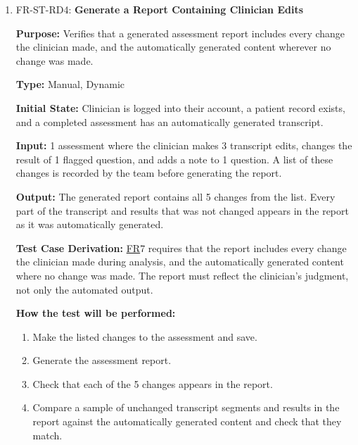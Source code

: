 \documentclass[12pt, titlepage]{article}
\newcommand{\srsfr}[1]{\href{https://github.com/Nour-Fawaz/MacaBoca/blob/main/pdfs/SRS/SRS.pdf}{FR}}
\renewcommand{\_}{\oldunderscore\allowbreak}
\begin{document}
\begin{enumerate}
  \item FR-ST-RD4: \textbf{Generate a Report Containing Clinician Edits\\}
  \begin{mdframed}[linewidth=0.5mm]
      \textbf{Purpose:} Verifies that a generated assessment report includes every change the clinician made, and the automatically generated content wherever no change was made. \par
      \textbf{Type:} Manual, Dynamic \par
      \textbf{Initial State:} Clinician is logged into their account, a patient record exists, and a completed assessment has an automatically generated transcript. \par
      \textbf{Input:} 1 assessment where the clinician makes 3 transcript edits, changes the result of 1 flagged question, and adds a note to 1 question. A list of these changes is recorded by the team before generating the report. \par
      \textbf{Output:} The generated report contains all 5 changes from the list. Every part of the transcript and results that was not changed appears in the report as it was automatically generated. \par
      \textbf{Test Case Derivation:} \srsfr*{7} requires that the report includes every change the clinician made during analysis, and the automatically generated content where no change was made. The report must reflect the clinician's judgment, not only the automated output. \par
      \textbf{How the test will be performed:}
      \begin{enumerate}
        \item[1.] Make the listed changes to the assessment and save.
        \item[2.] Generate the assessment report.
        \item[3.] Check that each of the 5 changes appears in the report.
        \item[4.] Compare a sample of unchanged transcript segments and results in the report against the automatically generated content and check that they match.
      \end{enumerate}
  \end{mdframed}


\end{enumerate}
\end{document}
